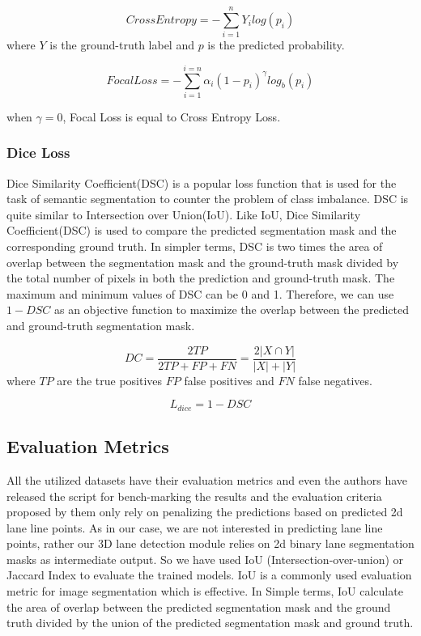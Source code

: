         
        \begin{equation}
            Cross Entropy = - \sum^{n}_{i=1}Y_{i}log(p_{i})
        \end{equation}
        where $Y$ is the ground-truth label and $p$ is the predicted probability.
        
        \begin{equation}
            Focal Loss = - \sum^{i=n}_{i=1} \alpha_{i}(1-p_{i})^{\gamma} log_{b}(p_{i})
        \end{equation}
        
         when $\gamma = 0$, Focal Loss is equal to Cross Entropy Loss. 
        
        \subsubsection{Dice Loss}
         Dice Similarity Coefficient(DSC) is a popular loss function that is used for the task of semantic segmentation to counter the problem of class imbalance. DSC is quite similar to Intersection over Union(IoU). Like IoU, Dice Similarity Coefficient(DSC) is used to compare the predicted segmentation mask and the corresponding ground truth. In simpler terms, DSC is two times the area of overlap between the segmentation mask and the ground-truth mask divided by the total number of pixels in both the prediction and ground-truth mask. The maximum and minimum values of DSC can be 0 and 1. Therefore, we can use $1- DSC$ as an objective function to maximize the overlap between the predicted and ground-truth segmentation mask.  
        
        \begin{equation}
            DC = \frac{2TP}{2TP + FP + FN} = \frac{2|X \cap Y|}{|X| + |Y|}
        \end{equation}
    where $TP$ are the true positives $FP$ false positives and $FN$ false negatives.  
        
        \begin{equation}
            L_{dice} = 1 - DSC
        \end{equation}
         
        
        \subsection{Evaluation Metrics}
        All the utilized datasets have their evaluation metrics and even the authors have released the script for bench-marking the results and the evaluation criteria proposed by them only rely on penalizing the predictions based on predicted 2d lane line points. As in our case, we are not interested in predicting lane line points, rather our 3D lane detection module relies on 2d binary lane segmentation masks as intermediate output. So we have used IoU (Intersection-over-union) or Jaccard Index to evaluate the trained models. IoU is a commonly used evaluation metric for image segmentation which is effective. In Simple terms, IoU calculate the area of overlap between the predicted segmentation mask and the ground truth divided by the union of the predicted segmentation mask and ground truth.
        
